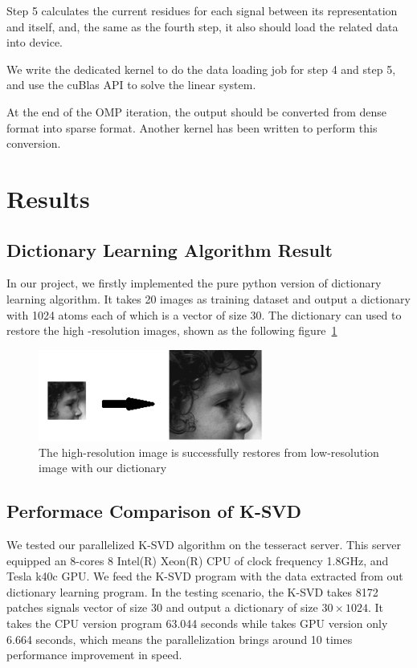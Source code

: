 \documentclass[english]{cccconf}
\begin{document}
Step 5 calculates the current residues for each signal between its representation and itself, and, the same as the fourth step, it also should load the related data into device.

We write the dedicated kernel to do the data loading job for step 4 and step 5, and use the cuBlas API to solve the linear system.

At the end of the OMP iteration, the output should be converted from dense format into sparse format. Another kernel has been written to perform this conversion.

\section{Results}
\subsection{Dictionary Learning Algorithm Result}
In our project, we firstly implemented the pure python version of dictionary learning algorithm. It takes 20 images as training dataset and output a dictionary with 1024 atoms each of which is a vector of size 30. The dictionary can used to restore the high -resolution images, shown as the following figure~\ref{figh3}
\begin{figure}[!htb]
	\centering
	\includegraphics[width=210pt]{7.png}
	\caption{The high-resolution image is successfully restores from low-resolution image with our dictionary}
	\label{figh3}
\end{figure} 

\subsection{Performace Comparison of K-SVD}
We tested our parallelized K-SVD algorithm on the tesseract server. This server equipped an 8-cores 8 Intel(R) Xeon(R) CPU of clock frequency 1.8GHz, and Tesla k40c GPU. We feed the K-SVD program with the data extracted from out dictionary learning program. In the testing scenario, the K-SVD takes 8172 patches  signals vector of size 30 and output a dictionary of size \(30\times1024\). It takes the CPU version program 63.044 seconds while takes GPU version only 6.664 seconds, which means the parallelization brings around 10 times performance improvement in speed.
\end{document}
